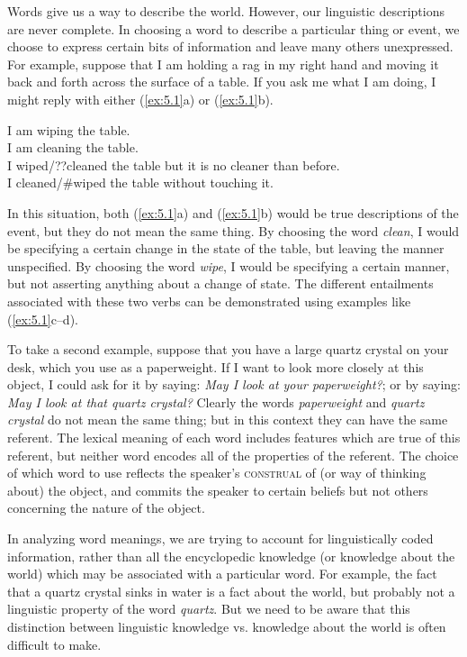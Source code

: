 Words give us a way to describe the world. However, our linguistic descriptions are never complete. In choosing a word to describe a particular thing or event, we choose to express certain bits of information and leave many others unexpressed. For example, suppose that I am holding a rag in my right hand and moving it back and forth across the surface of a table. If you ask me what I am doing, I might reply with either (\ref{ex:5.1}a) or (\ref{ex:5.1}b).


\ea \label{ex:5.1}
\ea I am wiping the table.\\
\ex I am cleaning the table.\\
\ex I wiped/??cleaned the table but it is no cleaner than before.\\
\ex I cleaned/\#wiped the table without touching it.
                       \z
\z


In this situation, both (\ref{ex:5.1}a) and (\ref{ex:5.1}b) would be true descriptions of the event, but they do not mean the same thing. By choosing the word \textit{clean}, I would be specifying a certain change in the state of the table, but leaving the manner unspecified. By choosing the word \textit{wipe}, I would be specifying a certain manner, but not asserting anything about a change of state. The different entailments associated with these two verbs can be demonstrated using examples like (\ref{ex:5.1}c--d).



To take a second example, suppose that you have a large quartz crystal on your desk, which you use as a paperweight. If I want to look more closely at this object, I could ask for it by saying: \textit{May I look at your paperweight?}; or by saying: \textit{May I look at that quartz crystal?} Clearly the words \textit{paperweight} and \textit{quartz crystal} do not mean the same thing; but in this context they can have the same referent. The lexical meaning of each word includes features which are true of this referent, but neither word encodes all of the properties of the referent. The choice of which word to use reflects the speaker’s \textsc{construal} of (or way of thinking about) the object, and commits the speaker to certain beliefs but not others concerning the nature of the object.



In analyzing word meanings, we are trying to account for linguistically coded information, rather than all the encyclopedic knowledge (or knowledge about the world) which may be associated with a particular word. For example, the fact that a quartz crystal sinks in water is a fact about the world, but probably not a linguistic property of the word \textit{quartz}. But we need to be aware that this distinction between linguistic knowledge vs. knowledge about the world is often difficult to make.


